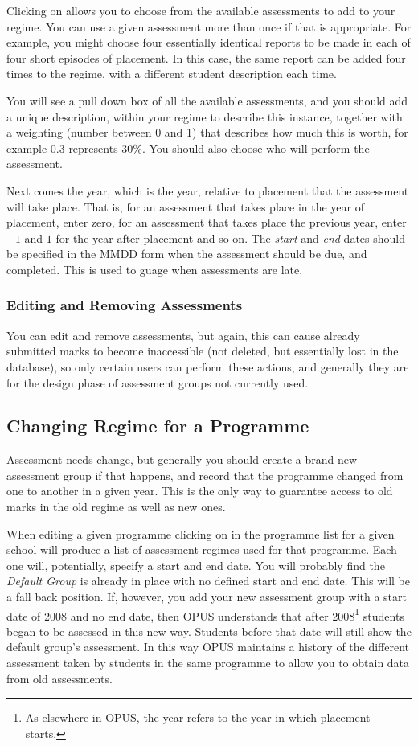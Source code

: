 \documentclass[12 pt]{book}
\begin{document}
Clicking on  allows you to choose from the available assessments to
add to your regime. You can use a given assessment more than once if that is
appropriate. For example, you might choose four essentially identical reports to
be made in each of four short episodes of placement. In this case, the same
report can be added four times to the regime, with a different student
description each time.

You will see a pull down box of all the available assessments, and you should
add a unique description, within your regime to describe this instance,
together with a weighting (number between 0 and 1) that describes how much this
is worth, for example 0.3 represents 30\%. You should also choose who will
perform the assessment.

Next comes the year, which is the year, relative to placement that the
assessment will take place. That is, for an assessment that takes place in the
year of placement, enter zero, for an assessment that takes place the previous
year, enter $-1$ and $1$ for the year after placement and so on. The
\emph{start} and \emph{end} dates should be specified in the MMDD form when
the assessment should be due, and completed. This is used to guage when 
assessments are late.

\subsubsection{Editing and Removing Assessments}

You can edit and remove assessments, but again, this can cause already submitted
marks to become inaccessible (not deleted, but essentially lost in the database),
so only certain users can perform these actions, and generally they are for the
design phase of assessment groups not currently used.

\subsection{Changing Regime for a Programme}

Assessment needs change, but generally you should create a brand new assessment
group if that happens, and record that the programme changed from one to 
another in a given year. This is the only way to guarantee access to old
marks in the old regime as well as new ones.

When editing a given programme clicking on  in the
programme list for a given school will produce a list of assessment regimes
used for that programme. Each one will, potentially, specify a start and end
date. You will probably find the \emph{Default Group} is already in place with
no defined start and end date. This will be a fall back position. If, however,
you add your new assessment group with a start date of 2008 and no end date,
then OPUS understands that after 2008\footnote{As elsewhere in OPUS, the year refers to the year in which placement
starts.} students began to be assessed in this new way. Students before that
date will still show the default group's assessment. In this way OPUS maintains
a history of the different assessment taken by students in the same programme
to allow you to obtain data from old assessments.
\end{document}

